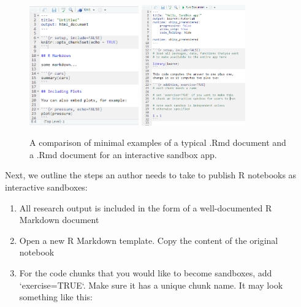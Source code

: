 \begin{figure}
         \includegraphics[width=0.42\textwidth]{skeleton-md}
         \hfill
         \includegraphics[width=0.4\textwidth]{skeleton}
\caption[A comparison of minimal examples of a typical .Rmd document and a .Rmd document for an interactive sandbox app]{A comparison of minimal examples of a typical .Rmd document and a .Rmd document for an interactive sandbox app.}\label{fig:fig_skeleton}
\end{figure}

Next, we outline the steps an author needs to take to publish R
notebooks as interactive sandboxes:

\begin{enumerate}
\def\labelenumi{\arabic{enumi}.}
\tightlist
\item
  All research output is included in the form of a well-documented R
  Markdown document
\item
  Open a new  R Markdown template. Copy the content of
  the original notebook
\item
  For the code chunks that you would like to become sandboxes, add
  `exercise=TRUE`. Make sure it has a unique chunk name. It may
  look something like this:
\end{enumerate}


